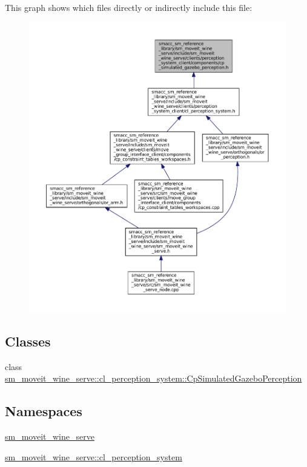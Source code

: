 This graph shows which files directly or indirectly include this file\+:
\nopagebreak
\begin{figure}[H]
\begin{center}
\leavevmode
\includegraphics[width=350pt]{sm__moveit__wine__serve_2include_2sm__moveit__wine__serve_2clients_2perception__system__client_2d333822da5de548b627999f10178e28b}
\end{center}
\end{figure}
\subsection*{Classes}
\begin{DoxyCompactItemize}
\item 
class \hyperlink{classsm__moveit__wine__serve_1_1cl__perception__system_1_1CpSimulatedGazeboPerception}{sm\+\_\+moveit\+\_\+wine\+\_\+serve\+::cl\+\_\+perception\+\_\+system\+::\+Cp\+Simulated\+Gazebo\+Perception}
\end{DoxyCompactItemize}
\subsection*{Namespaces}
\begin{DoxyCompactItemize}
\item 
 \hyperlink{namespacesm__moveit__wine__serve}{sm\+\_\+moveit\+\_\+wine\+\_\+serve}
\item 
 \hyperlink{namespacesm__moveit__wine__serve_1_1cl__perception__system}{sm\+\_\+moveit\+\_\+wine\+\_\+serve\+::cl\+\_\+perception\+\_\+system}
\end{DoxyCompactItemize}
